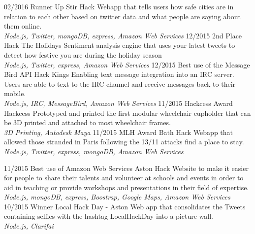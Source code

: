 \documentclass[]{friggeri-cv}
\begin{document}
\begin{entrylist}
    {02/2016}
    {Runner Up}
    {Stir Hack}
    {Webapp that tells users how safe cities are in relation to each other based on twitter data and what people are saying about them online.\\
    \emph{Node.js, Twitter, mongoDB, express, Amazon Web Services}}
        \entry
    {12/2015}
    {2nd Place}
    {Hack The Holidays}
    {Sentiment analysis engine that uses your latest tweets to detect how festive you are during the holiday season \\
    \emph{Node.js, Twitter, express, Amazon Web Services}}
        \entry
    {12/2015}
    {Best use of the Message Bird API}
    {Hack Kings}
    {Enabling text message integration into an IRC server. Users are able to text to the IRC channel and receive messages back to their mobile. \\
    \emph{Node.js, IRC, MessageBird, Amazon Web Services}}
        \entry
    {11/2015}
    {Hackcess Award}
    {Hackcess}
    {Prototyped and printed the first modular wheelchair cupholder that can be 3D printed and attached to most wheelchair frames. \\
    \emph{3D Printing, Autodesk Maya}}
        \entry
    {11/2015}
    {MLH Award}
    {Bath Hack }
    {Webapp that allowed those stranded in Paris following the 13/11 attacks find a place to stay.\\
    \emph{Node.js, Twitter, express, mongoDB, Amazon Web Services}}
    \end{entrylist}
    
    \begin{entrylist}
        \entry
    {11/2015}
    {Best use of Amazon Web Services }
    {Aston Hack}
    {Website to make it easier for people to share their talents and volunteer at schools and events in order to aid in teaching or provide workshops and presentations in their field of expertise.\\
    \emph{Node.js, mongoDB, express, Boostrap, Google Maps, Amazon Web Services}}
        \entry
    {10/2015}
    {Winner}
    {Local Hack Day - Aston}
    {Web app that consolidates the Tweets containing selfies with the hashtag LocalHackDay into a picture wall. \\
    \emph{Node.js, Clarifai}}
    \end{entrylist}
\end{document}
